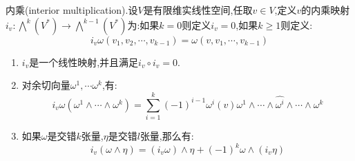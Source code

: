 内乘(interior multiplication).设$V$是有限维实线性空间,任取$v\in V$,定义$v$的内乘映射$i_v:\bigwedge^k(V^*)\to\bigwedge^{k-1}(V^*)$为:如果$k=0$则定义$i_v=0$,如果$k\ge1$则定义:$$i_v\omega(v_1,v_2,\cdots,v_{k-1})=\omega(v,v_1,\cdots,v_{k-1})$$
\begin{enumerate}
	\item $i_v$是一个线性映射,并且满足$i_v\circ i_v=0$.
	\item 对余切向量$\omega^1,\cdots\omega^k$,有:
	$$i_v\omega(\omega^1\wedge\cdots\wedge\omega^k)=\sum_{i=1}^k(-1)^{i-1}\omega^i(v)\omega^1\wedge\cdots\wedge\hat{\omega^i}\wedge\cdots\wedge\omega^k$$
	\item 如果$\omega$是交错$k$张量,$\eta$是交错$l$张量,那么有:
	$$i_v(\omega\wedge\eta)=(i_v\omega)\wedge\eta+(-1)^k\omega\wedge(i_v\eta)$$
\end{enumerate}

